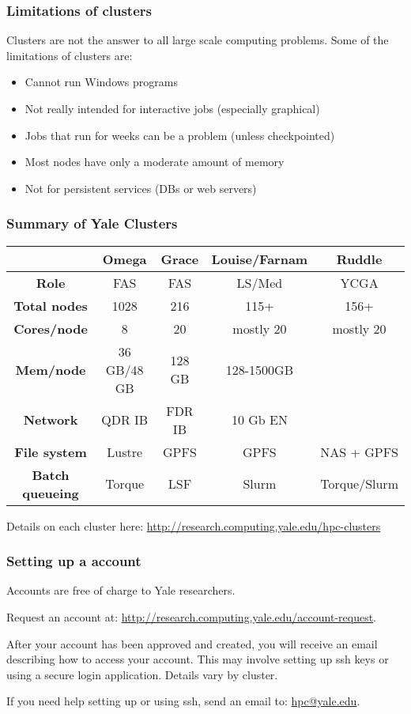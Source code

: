\documentclass[10pt]{beamer}
\begin{document}
\begin{frame}
\frametitle{Limitations of clusters}
Clusters are not the answer to all large scale computing problems.
Some of the limitations of clusters are:

\begin{itemize}
\item Cannot run Windows programs
\item Not really intended for interactive jobs (especially graphical)
\item Jobs that run for weeks can be a problem (unless checkpointed)
\item Most nodes have only a moderate amount of memory
\item Not for persistent services (DBs or web servers)
\end{itemize}
\end{frame}

\begin{frame}[fragile]
\frametitle{Summary of Yale Clusters}
\begin{tabular}{|c|c|c|c|c|}
\hline
& \textbf{Omega} & \textbf{Grace}& \textbf{Louise/Farnam} & \textbf{Ruddle} \\
\hline
\textbf{Role} & FAS & FAS & LS/Med & YCGA  \\
\hline
\textbf{Total nodes} & 1028 & 216 & 115+ & 156+  \\
\hline
\textbf{Cores/node} & 8 & 20 & mostly 20  & mostly 20 \\
\hline
\textbf{Mem/node} & 36 GB/48 GB & 128 GB & 128-1500GB  \\
\hline
\textbf{Network} & QDR IB & FDR IB& 10 Gb EN  \\
\hline
\textbf{File system} & Lustre & GPFS & GPFS & NAS + GPFS \\
\hline
\textbf{Batch queueing} & Torque & LSF & Slurm & Torque/Slurm \\
\hline
\end{tabular}

\vskip10pt

Details on each cluster here:
\url{http://research.computing.yale.edu/hpc-clusters}

\end{frame}

\begin{frame}[fragile]
\frametitle{Setting up a account}

Accounts are free of charge to Yale researchers.
\vskip10pt

Request an account at: \url{http://research.computing.yale.edu/account-request}.

\vskip10pt
After your account has been approved and created, you will receive
an email describing how to access your account.  This may involve setting up ssh keys or 
using a secure login application.  Details vary by cluster.

\vskip10pt
If you need help setting up or using ssh, send an email to: \url{hpc@yale.edu}.
\end{frame}
\end{document}
